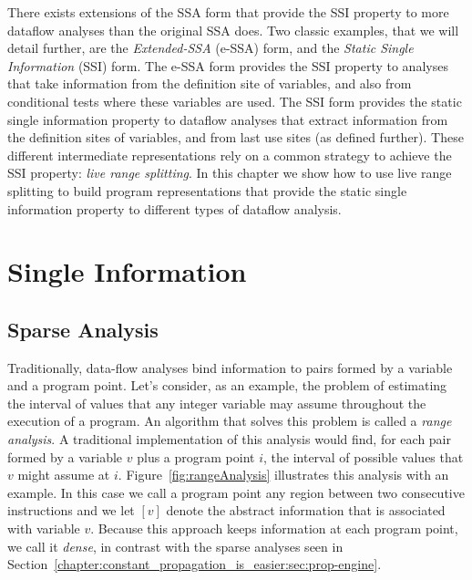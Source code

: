 There exists extensions of the SSA form that provide the SSI property to more
dataflow analyses than the original SSA does.
Two classic examples, that we will detail further, are the {\em Extended-SSA} (e-SSA) form, and the {\em Static Single Information} (SSI) form.
The e-SSA form provides the SSI property to analyses that take information from
the definition site of variables, and also from conditional tests where these
variables are used.
The SSI form provides the static single information property to dataflow
analyses that extract information from the definition sites of variables, and from last use sites (as defined further).
These different intermediate representations rely on a common strategy to achieve the SSI property: {\em live range splitting}.
In this chapter we show how to use live range splitting to build program
representations that provide the static single information property to different
types of dataflow analysis.

\section{Single Information}
\label{sec:ssi:pereira:single}



\subsection{Sparse Analysis}
\label{sec:ssi:pereira:sparse}

Traditionally, data-flow analyses bind information to pairs formed by a variable and a program point.
Let's consider, as an example, the problem of estimating the interval of values that any integer variable may assume throughout the execution of a program.
An algorithm that solves this problem is called a {\em range analysis}.
A traditional implementation of this analysis would find, for each pair formed by a variable $v$ plus a program point $i$, the interval of possible values that $v$ might assume at $i$.
Figure~\ref{fig:rangeAnalysis} illustrates this analysis with an example.
In this case we call a program point any region between two consecutive
instructions and we let $[v]$ denote the abstract information that is associated
with variable $v$.
Because this approach keeps information at each program point, we call it {\em dense}, in contrast with the sparse analyses seen in Section~\ref{chapter:constant_propagation_is_easier:sec:prop-engine}.

